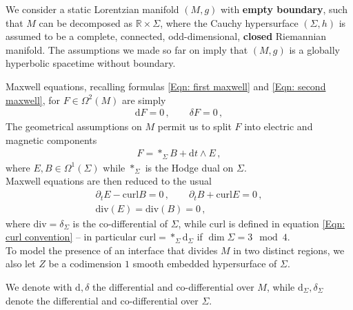 We consider a static Lorentzian manifold $(M,g)$ with \textbf{empty boundary}, such that $M$ can be decomposed as $\mathbb{R}\times\Sigma$, where the Cauchy hypersurface $(\Sigma,h)$ is assumed to be a complete, connected, odd-dimensional, \textbf{closed} Riemannian manifold.
The assumptions we made so far on imply that $(M,g)$ is a globally hyperbolic spacetime without boundary.

\noindent Maxwell equations, recalling formulas \eqref{Eqn: first maxwell} and \eqref{Eqn: second maxwell}, for $F\in\Omega^2(M)$ are simply
\begin{align}\label{Eqn: covariant Maxwell equations}
\mathrm{d}F=0\,,\qquad\delta F=0\,,
\end{align}
The geometrical assumptions on $M$ permit us to split $F$ into electric and magnetic components
\begin{align}\label{Eqn: electric and magnetic components}
F=\ast_\Sigma B+\mathrm{d}t\wedge E\,,
\end{align}
where $E,B\in\Omega^1(\Sigma)$ while $\ast_\Sigma$ is the Hodge dual on $\Sigma$.\\
\noindent Maxwell equations are then reduced to the usual
\begin{subequations}\label{Eqn: Maxwell equations}
	\begin{align}
	\label{Eqn: dynamical Maxwell equations}
	\partial_tE-\mathrm{curl}B=0\,,\qquad
	\partial_tB+\mathrm{curl}E=0\,,\\
	\label{Eqn: non-dynamical Maxwell equations}
	\mathrm{div}(E)=\mathrm{div}(B)=0\,,
	\end{align}
\end{subequations}
where $\mathrm{div}=\delta_\Sigma$ is the co-differential of $\Sigma$, while $\mathrm{curl}$ is defined in equation \eqref{Eqn: curl convention} -- in particular $\mathrm{curl}=\ast_\Sigma\mathrm{d}_\Sigma$ if $\dim\Sigma=3\mod 4$.\\
To model the presence of an interface that divides $M$ in two distinct regions, we also let $Z$ be a codimension $1$ smooth embedded hypersurface of $\Sigma$.

We denote with $\mathrm{d},\delta$ the differential and co-differential over $M$, while $\mathrm{d}_\Sigma,\delta_\Sigma$ denote the differential and co-differential over $\Sigma$.

